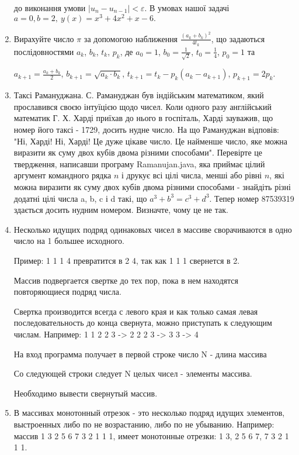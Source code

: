 \documentclass[]{article}
\begin{document}
\begin{enumerate}
до виконання умови \(\left| u_{n} - u_{n - 1} \right| < \varepsilon\). В
умовах нашої задачі \(a = 0,b = 2,\ y(x) = x^{3} + 4x^{2} + x - 6.\)


\item
Вирахуйте число $\pi$ за допомогою наближення $\frac{(a_{k} + b_{k})^{2}}{4t_{k}}$,
що задаються послідовностями $a_k$, $b_k$, $t_k$, $p_k$, де
$a_0 = 1$, $b_0 = \frac{1}{\sqrt{2}}$, $t_0 = \frac{1}{4}$, $p_0 = 1$ та

$a_{k+1} = \frac{a_{k} + b_{k}}{2}$, $b_{k+1} = \sqrt{a_{k}\cdot b_{k}}$, 
$t_{k+1} = t_{k} - p_{k}(a_{k}-a_{k+1})$, $p_{k+1} =2p_{k}$.


\item Таксі Рамануджана. С. Рамануджан був індійським математиком, який прославився своєю інтуїцією щодо чисел.
 Коли одного разу англійський математик Г. Х. Харді приїхав до нього в госпіталь, Харді зауважив, що номер його таксі - 1729,
 досить нудне число. На що Рамануджан відповів: "Ні, Харді! Ні, Харді! Це дуже цікаве число.
Це найменше число, яке можна виразити як суму двох кубів двома різними способами".
Перевірте це твердження, написавши програму Ramanujan.java, яка приймає цілий аргумент командного рядка $n$ і друкує всі цілі числа,
 менші або рівні $n$, які можна виразити як суму двох кубів двома різними способами - знайдіть різні додатні цілі числа a, b, c і d такі,
 що $a^{3} + b^{3} = c^{3} + d^{3}$. 
Тепер номер 87539319 здається досить нудним номером. Визначте, чому це не так.


\item

Несколько идущих подряд одинаковых чисел в массиве сворачиваются в одно число на 1 большее исходного.

Пример: 1 1 1 4 превратится в 2 4, так как 1 1 1 свернется в 2. 

Массив подвергается свертке до тех пор, пока в нем находятся повторяющиеся подряд числа.

Свертка производится всегда с левого края и как только самая левая последовательность до конца свернута, можно приступать к следующим числам. Например: 1 1 2 2 3 -> 2 2 2 3 -> 3 3 -> 4

На вход программа получает в первой строке число N - длина массива

Со следующей строки следует  N целых чисел - элементы массива.

Необходимо вывести свернутый массив.

\item
В массивах монотонный отрезок - это несколько подряд идущих элементов, выстроенных либо по не возрастанию, либо по не убыванию. Например: массив 1 3 2 5 6 7 3 2 1 1 1, имеет монотонные отрезки: 1 3, 2 5 6 7, 7 3 2 1 1 1.


\end{enumerate}
\end{document}
